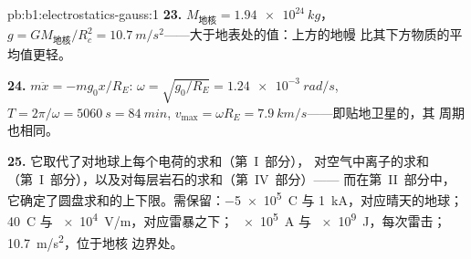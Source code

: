 \begin{solution}{pb:b1:electrostatics-gauss:1}
\textbf{23.} $M_{\text{地核}} = \qty{1.94e24}{kg}$，$g = GM_{\text{地核}}/R_c^2 =
\qty{10.7}{m/s^2}$——大于地表处的值：上方的地幔
比其下方物质的平均值更轻。

\textbf{24.} $m\ddot x = -mg_0x/R_E$: $\omega = \sqrt{g_0/R_E} = \qty{1.24e-3}{rad/s}$,
$T = 2\pi/\omega = \qty{5060}{s} = \qty{84}{min}$, $v_{\max} = \omega R_E =
\qty{7.9}{km/s}$——即贴地卫星的，其
周期也相同。

\textbf{25.} 它取代了对地球上每个电荷的求和（第~I~部分），
对空气中离子的求和（第~I~部分），以及对每层岩石的求和（第~IV~部分）——
而在第~II~部分中，它确定了圆盘求和的上下限。需保留：\qty{-5e5}{C} 与
\qty{1}{kA}，对应晴天的地球；\qty{40}{C} 与 \qty{e4}{V/m}，对应雷暴之下；
\qty{e5}{A} 与 \qty{e9}{J}，每次雷击；\qty{10.7}{m/s^2}，位于地核
边界处。
\end{solution}
